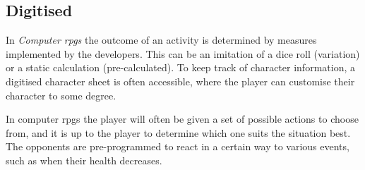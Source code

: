 \subsection{Digitised}
In \emph{Computer \ac{rpgs}} the outcome of an activity is determined by measures implemented by the developers. This can be an imitation of a dice roll (variation) or a static calculation (pre-calculated).
To keep track of character information, a digitised character sheet is often accessible, where the player can customise their character to some degree.

In computer \ac{rpgs} the player will often be given a set of possible actions to choose from, and it is up to the player to determine which one suits the situation best. The opponents are pre-programmed to react in a certain way to various events, such as when their health decreases.

\pagebreak

